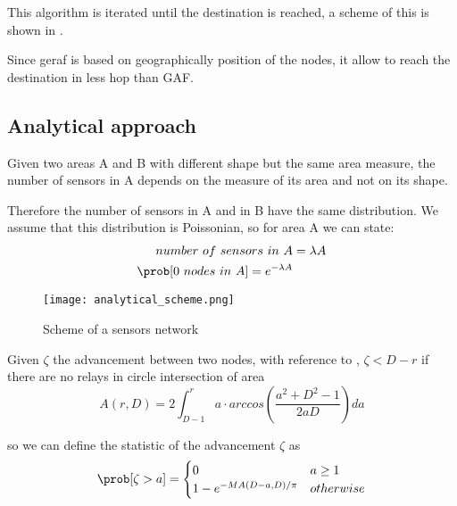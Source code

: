 This algorithm is iterated until the destination is reached, a scheme of this is shown in .

Since \gls{geraf} is based on geographically position of the nodes, it allow to reach the destination in less hop than GAF.

\subsection{Analytical approach}
	Given two areas A and B with different shape but the same area measure, the number of sensors in A depends on the measure of its area and not on its shape.

	Therefore the number of sensors in A and in B have the same distribution. We assume that this distribution is Poissonian, so for area A we can state:
	\begin{equation}
		\begin{split}
			number ~of ~sensors ~in ~A &= \lambda A \\
			\prob[0 ~nodes ~in ~A] = e^{-\lambda A}
		\end{split}
	\end{equation}

	\begin{figure}[h]
		\centering
		\texttt{[image: analytical\_scheme.png]}
		\caption{Scheme of a sensors network}
		\label{fig:anapproach}
	\end{figure}


	Given $\zeta$ the advancement between two nodes, with reference to , $\zeta < D - r$ if there are no relays in circle intersection of area
	\begin{equation}
			A(r,D) = 2 \int_{D-1}^r a \cdot arccos( \frac{a^2 + D^2 - 1}{2aD}) da
	\end{equation}

	so we can define the statistic of the advancement $\zeta$ as
	\begin{equation}
		\prob[\zeta > a] = \begin{cases}
			0 & a \ge 1\\
			1-e^{-MA(D-a,D)/\pi} & otherwise
		\end{cases}
	\end{equation}

